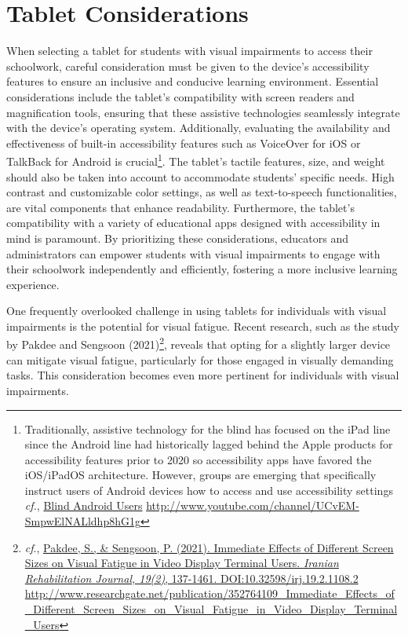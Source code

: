 \documentclass[12pt,letterpaper,twoside]{extreport}
\begin{document}
\pagebreak\hypertarget{tablet-considerations}{}\section{Tablet Considerations}\label{tab:tablelet-considerations}

When selecting a tablet for students with visual impairments to access their schoolwork, careful consideration must be given to the device's accessibility features to ensure an inclusive and conducive learning environment. Essential considerations include the tablet's compatibility with screen readers and magnification tools, ensuring that these assistive technologies seamlessly integrate with the device's operating system. Additionally, evaluating the availability and effectiveness of built-in accessibility features such as VoiceOver for iOS or TalkBack for Android is crucial\footnote{\raggedright Traditionally, assistive technology for the blind has focused on the iPad line since the Android line had historically lagged behind the Apple products for accessibility features prior to 2020 so accessibility apps have favored the iOS/iPadOS architecture. However, groups are emerging that specifically instruct users of Android devices how to access and use accessibility settings \textit{cf.}, \href{http://www.youtube.com/channel/UCvEM-SmpwElNALldhp8hG1g}{Blind Android Users} \url{http://www.youtube.com/channel/UCvEM-SmpwElNALldhp8hG1g}}. The tablet's tactile features, size, and weight should also be taken into account to accommodate students' specific needs. High contrast and customizable color settings, as well as text-to-speech functionalities, are vital components that enhance readability. Furthermore, the tablet's compatibility with a variety of educational apps designed with accessibility in mind is paramount. By prioritizing these considerations, educators and administrators can empower students with visual impairments to engage with their schoolwork independently and efficiently, fostering a more inclusive learning experience.

One frequently overlooked challenge in using tablets for individuals with visual impairments is the potential for visual fatigue. Recent research, such as the study by Pakdee and Sengsoon (2021)\footnote{\raggedright \textit{cf}., \href{http://www.researchgate.net/publication/352764109_Immediate_Effects_of_Different_Screen_Sizes_on_Visual_Fatigue_in_Video_Display_Terminal_Users}{Pakdee, S., \& Sengsoon, P. (2021). Immediate Effects of Different Screen Sizes on Visual Fatigue in Video Display Terminal Users. \textit{Iranian Rehabilitation Journal, 19(2)}, 137-1461. DOI:10.32598/irj.19.2.1108.2} \hfill\break\url{http://www.researchgate.net/publication/352764109_Immediate_Effects_of_Different_Screen_Sizes_on_Visual_Fatigue_in_Video_Display_Terminal_Users}}, reveals that opting for a slightly larger device can mitigate visual fatigue, particularly for those engaged in visually demanding tasks. This consideration becomes even more pertinent for individuals with visual impairments.
\end{document}
